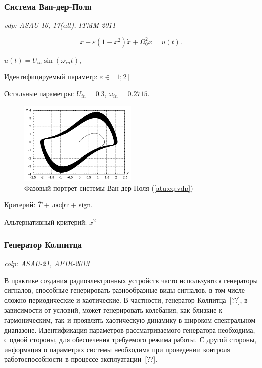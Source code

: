 \documentclass[a4paper,12pt]{article}
\newcommand{\LinkRef}[1]{ \textit{#1} }
\begin{document}
\FloatBarrier
\subsubsection{Система Ван-дер-Поля} %

\LinkRef{
  vdp: ASAU-16, 17(alt), ITMM-2011
}

\begin{equation}
 \ddot{x} + \varepsilon (1-x^2)  \dot{x} + \Omega_0^2 x  = u(t) .
\label{atu:eq:vdp}
\end{equation}

\( u(t) = U_{in} \sin ( \omega_{in} t ) \),

Идентифицируемый параметр:
\( \varepsilon \in [1;2]  \)

Остальные параметры:
\(U_{in}=0.3\),
\(\omega_{in}=0.2715\).


\begin{figure}[htb!]
\centerline{\includegraphics[width=0.5\textwidth]{p/cha/vdp_phase.pdf} }
\caption{Фазовый портрет системы Ван-дер-Поля (\ref{atu:eq:vdp})}
\label{atu:f:vdp_phase}
\end{figure}

Критерий:
$\overline{T}$ + люфт + sign.

Альтернативный критерий:
$\overline{x^2}$


\FloatBarrier
\subsubsection{Генератор Колпитца} %

\LinkRef{
  colp: ASAU-21, APIR-2013
}

В  практике   создания   радиоэлектронных   устройств   часто   используются
генераторы сигналов, способные генерировать разнообразные виды  сигналов, в том числе
сложно-периодические и хаотические.
В частности, генератор  Колпитца~[??], в  зависимости   от   условий,   может
генерировать  колебания,  как  близкие  к  гармоническим,  так  и  проявлять
хаотическую  динамику  в  широком  спектральном   диапазоне.   Идентификация
параметров рассматриваемого генератора  необходима,  с  одной  стороны,  для
обеспечения  требуемого  режима  работы.  С  другой  стороны,  информация  о
параметрах системы необходима при проведении  контроля  работоспособности  в
процессе эксплуатации~[??].
\end{document}
